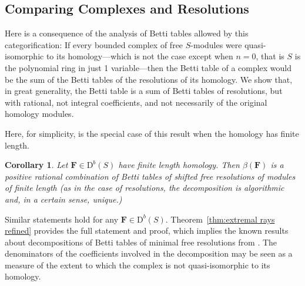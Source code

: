 \documentclass[12pt]{amsart}
\newtheorem{cor}[lemma]{Corollary}
\theoremstyle{definition}
\theoremstyle{remark}
\newcommand{\codim}{\operatorname{codim}}
\newcommand{\FF}{\mathbf{F}}
\newcommand{\subsecNTOC}[1]{\noindent{\bf{#1}}} %
\newcommand{\DD}{\mathrm{D}}
\begin{document}
\subsection*{Comparing Complexes and Resolutions}
Here is a consequence of the analysis of Betti tables allowed by this categorification: If every bounded complex of free $S$-modules were quasi-isomorphic to its homology---which is not the case except when $n=0$, that is $S$ is the polynomial ring in just 1 variable---then the Betti table of a complex would be the sum of the Betti tables of the resolutions of its homology.  We show that, in great generality, the Betti table is  a sum of Betti tables of resolutions, but with rational, not integral coefficients, and not necessarily of the original homology modules. 

Here, for simplicity, is the special case of this result when the homology has finite length. 
%
\begin{cor}\label{cor:decompose}
Let $\FF\in \DD^b(S)$ have finite length homology.  Then $\beta(\FF)$ is a positive rational combination of Betti tables of shifted free resolutions of modules of finite length (as in the case of resolutions, the decomposition is algorithmic and, in a certain sense, unique.)
\end{cor}

Similar statements hold for any $\FF\in \DD^b(S)$.  Theorem~\ref{thm:extremal rays refined} provides the full statement and proof, which implies the known results about decompositions of Betti tables
of minimal free resolutions from \cites{eis-schrey1,boij-sod2}.
The denominators of the coefficients involved in the decomposition may be seen as a measure of the extent to which the complex is not quasi-isomorphic to its homology. 
\end{document}
